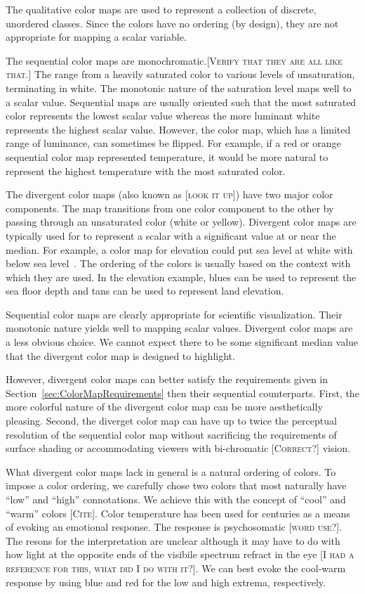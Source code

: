 \documentclass[twocolumn]{article}
\newcommand{\lcite}[1]{~\cite{#1}}
\newcommand{\sticky}[1]{\textsc{[#1]}}
\begin{document}
The qualitative color maps are used to represent a collection of discrete,
unordered classes.  Since the colors have no ordering (by design), they are
not appropriate for mapping a scalar variable.

The sequential color maps are monochromatic.\sticky{Verify that they are all
  like that.}  The range from a heavily saturated color to various levels
of unsaturation, terminating in white.  The monotonic nature of the
saturation level maps well to a scalar value.  Sequential maps are usually
oriented such that the most saturated color represents the lowest scalar
value whereas the more luminant white represents the highest scalar value.
However, the color map, which has a limited range of luminance, can
sometimes be flipped.  For example, if a red or orange sequential color map
represented temperature, it would be more natural to represent the highest
temperature with the most saturated color.

The divergent color maps (also known as \sticky{look it up}) have two major
color components.  The map transitions from one color component to the
other by passing through an unsaturated color (white or yellow).  Divergent
color maps are typically used for to represent a scalar with a significant
value at or near the median.  For example, a color map for elevation could
put sea level at white with below sea level\lcite{Tufte97}.  The ordering
of the colors is usually based on the context with which they are used.  In
the elevation example, blues can be used to represent the sea floor depth
and tans can be used to represent land elevation.

Sequential color maps are clearly appropriate for scientific visualization.
Their monotonic nature yields well to mapping scalar values.  Divergent
color maps are a less obvious choice.  We cannot expect there to be some
significant median value that the divergent color map is designed to
highlight.

However, divergent color maps can better satisfy the requirements given in
Section~\ref{sec:ColorMapRequirements} then their sequential counterparts.
First, the more colorful nature of the divergent color map can be more
aesthetically pleasing.  Second, the diverget color map can have up to
twice the perceptual resolution of the sequential color map without
sacrificing the requirements of surface shading or accommodating viewers
with bi-chromatic \sticky{Correct?} vision.

What divergent color maps lack in general is a natural ordering of colors.
To impose a color ordering, we carefully chose two colors that most
naturally have ``low'' and ``high'' connotations.  We achieve this with the
concept of ``cool'' and ``warm'' colors \sticky{Cite}.  Color temperature
has been used for centuries as a means of evoking an emotional response.
The response is psychosomatic \sticky{word use?}.  The resons for the
interpretation are unclear although it may have to do with how light at the
opposite ends of the visibile spectrum refract in the eye \sticky{I had a
  reference for this, what did I do with it?}.  We can best evoke the
cool-warm response by using blue and red for the low and high extrema,
respectively.
\end{document}
